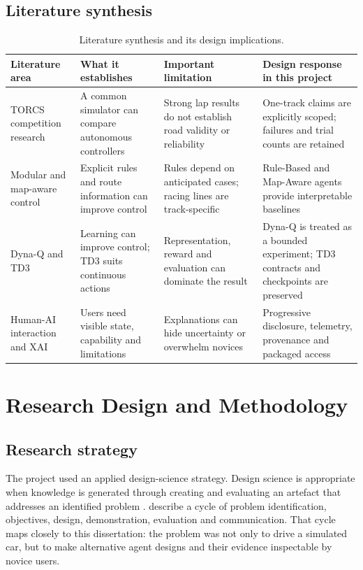 \subsection{Literature synthesis}

\begin{table}[htbp]
  \centering
  \caption{Literature synthesis and its design implications.}
  \label{tab:literature-synthesis}
  \small
  \begin{tabularx}{\textwidth}{p{}YYY}
    \toprule
    Literature area & What it establishes & Important limitation & Design response in this project \\
    \midrule
    TORCS competition research & A common simulator can compare autonomous controllers & Strong lap results do not establish road validity or reliability & One-track claims are explicitly scoped; failures and trial counts are retained \\
    Modular and map-aware control & Explicit rules and route information can improve control & Rules depend on anticipated cases; racing lines are track-specific & Rule-Based and Map-Aware agents provide interpretable baselines \\
    Dyna-Q and TD3 & Learning can improve control; TD3 suits continuous actions & Representation, reward and evaluation can dominate the result & Dyna-Q is treated as a bounded experiment; TD3 contracts and checkpoints are preserved \\
    Human-AI interaction and XAI & Users need visible state, capability and limitations & Explanations can hide uncertainty or overwhelm novices & Progressive disclosure, telemetry, provenance and packaged access \\
    \bottomrule
  \end{tabularx}
\end{table}

\section{Research Design and Methodology}
\label{ch:methodology}

\subsection{Research strategy}

The project used an applied design-science strategy. Design science is appropriate when knowledge is generated through creating and evaluating an artefact that addresses an identified problem \parencite{hevner2004}. \textcite{peffers2007} describe a cycle of problem identification, objectives, design, demonstration, evaluation and communication. That cycle maps closely to this dissertation: the problem was not only to drive a simulated car, but to make alternative agent designs and their evidence inspectable by novice users.

